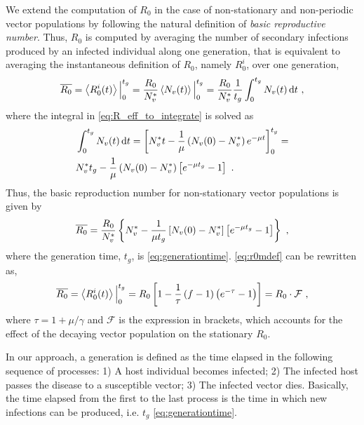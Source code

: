 We extend the computation of $R_0$ in the case of non-stationary and
non-periodic vector populations by following the natural definition of
\textit{basic reproductive number}. Thus, $R_0$ is computed by averaging the
number of  secondary infections produced by an infected individual along one
generation, that is equivalent to averaging the instantaneous definition of
$R_0$, namely $R_0^i$, over one generation,
\begin{equation}\label{eq:R_eff_to_integrate}
    \overline{R_0}=\left<R_0^i(t)\right>\Big\rvert_{0}^{t_g}=
    \frac{R_0}{N_v^*}\left<N_v(t)\right>\Big\rvert_{0}^{t_g}=
    \frac{R_0}{N_v^*}\frac{1}{t_g}\int_0^{t_g}N_v(t)
    \, \mathrm{d} t \ ,
\end{equation}
where the integral in \cref{eq:R_eff_to_integrate} is solved as
\begin{equation}
    \begin{aligned}
         & \int_0^{t_g}N_v(t) \, \mathrm{d} t=\left[N_v^*t
        -\frac{1}{\mu}\left(N_v(0)-N_v^*\right)e^{-\mu t}\right]_{0}^{t_g}=   \\
         & N_v^*t_g -\frac{1}{\mu}\left(N_v(0)-N_v^*\right)\left[e^{-\mu
                    t_g} - 1\right] \ .
    \end{aligned}
\end{equation}
Thus, the basic reproduction number for non-stationary vector populations
is given by
\begin{equation}
    \overline{R_0}=\frac{R_0}{N_v^*}\left\{N_v^*-\frac{1}{\mu
        t_g}\claudator{N_v(0)-N_v^*}\claudator{e^{-\mu t_g}-1}\right\} \ ,
    \label{eq:r0mdef}
\end{equation}
where the generation time, $t_g$, is \cref{eq:generationtime}.
\cref{eq:r0mdef} can be rewritten as,
\begin{equation}
    \overline{R_0}=\left<R_{0}^{i}(t)\right>\Big\rvert_{0}^{t_g}=
    R_0\left[1-\frac{1}{\tau}\left(f-1\right)
        \left(e^{-\tau}-1\right)\right]=R_0\cdot\mathcal{F}
    \ ,
    \label{eq:R0_non_stationary2}
\end{equation}
where $\tau=1+\mu/\gamma$ and $\mathcal{F}$ is the expression in brackets,
which accounts for the effect of the decaying vector population on the
stationary $R_0$.

In our approach, a generation is defined as the time elapsed in the
following sequence of processes: 1) A host individual becomes infected; 2) The
infected host passes the disease to a susceptible vector; 3) The infected
vector dies. Basically, the time elapsed from the first to the last process is
the time in which new infections can be produced, i.e. $t_g$
\cref{eq:generationtime}.